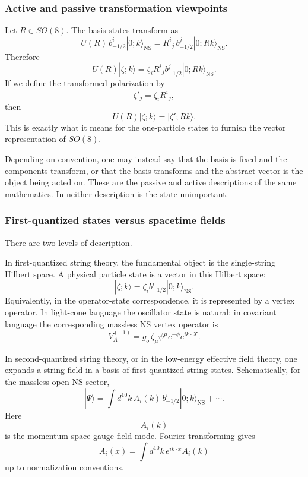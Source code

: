 \documentclass[
  10pt,
  a4paper,
  openany]{book}
\begin{document}
\subsubsection{Active and passive transformation
viewpoints}\label{active-and-passive-transformation-viewpoints}

Let \(R\in SO(8)\). The basis states transform as \[
U(R)\,b_{-1/2}^i|0;k\rangle_{\text{NS}}
=
R^i{}_j\,b_{-1/2}^j|0;Rk\rangle_{\text{NS}}.
\] Therefore \[
U(R)|\zeta;k\rangle
=
\zeta_i R^i{}_j b_{-1/2}^j|0;Rk\rangle_{\text{NS}}.
\] If we define the transformed polarization by \[
\zeta'_j
=
\zeta_i R^i{}_j,
\] then \[
U(R)|\zeta;k\rangle
=
|\zeta';Rk\rangle.
\] This is exactly what it means for the one-particle states to furnish
the vector representation of \(SO(8)\).

Depending on convention, one may instead say that the basis is fixed and
the components transform, or that the basis transforms and the abstract
vector is the object being acted on. These are the passive and active
descriptions of the same mathematics. In neither description is the
state unimportant.

\subsubsection{First-quantized states versus spacetime
fields}\label{first-quantized-states-versus-spacetime-fields}

There are two levels of description.

In first-quantized string theory, the fundamental object is the
single-string Hilbert space. A physical particle state is a vector in
this Hilbert space: \[
|\zeta;k\rangle
=
\zeta_i b_{-1/2}^i|0;k\rangle_{\text{NS}}.
\] Equivalently, in the operator-state correspondence, it is represented
by a vertex operator. In light-cone language the oscillator state is
natural; in covariant language the corresponding massless NS vertex
operator is \[
V_A^{(-1)}
=
g_o\,\zeta_\mu \psi^\mu e^{-\phi}e^{ik\cdot X}.
\]

In second-quantized string theory, or in the low-energy effective field
theory, one expands a string field in a basis of first-quantized string
states. Schematically, for the massless open NS sector, \[
|\Psi\rangle
=
\int d^{10}k\,
A_i(k)\,b_{-1/2}^i|0;k\rangle_{\text{NS}}
+\cdots.
\] Here \[
A_i(k)
\] is the momentum-space gauge field mode. Fourier transforming gives \[
A_i(x)
=
\int d^{10}k\, e^{ik\cdot x}A_i(k)
\] up to normalization conventions.
\end{document}
